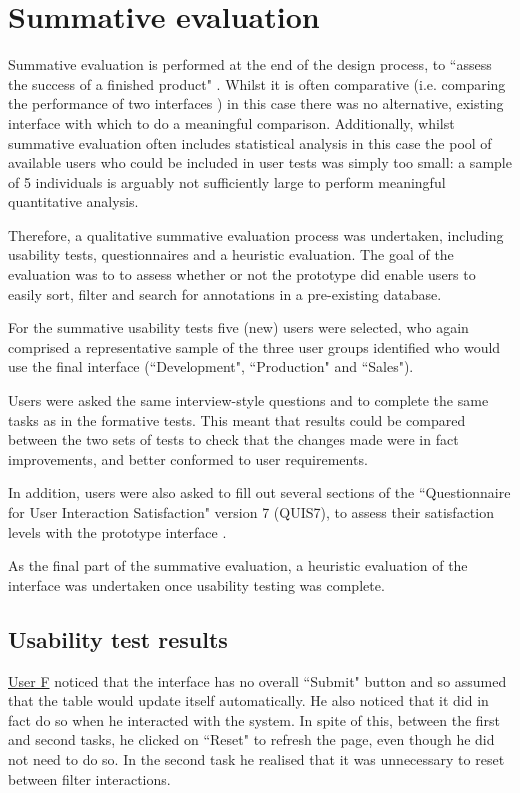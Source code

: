 \section{Summative evaluation}
Summative evaluation is performed at the end of the design process, to ``assess the success of a finished product" \citep[p. 437]{RogersPreece}. Whilst it is often comparative (i.e. comparing the performance of two interfaces \citep[p. 54]{GabbardHix}) in this case there was no alternative, existing interface with which to do a meaningful comparison. Additionally, whilst summative evaluation often includes statistical analysis \cite[p. 149]{Hartson} in this case the pool of available users who could be included in user tests was simply too small: a sample of 5 individuals is arguably not sufficiently large to perform meaningful quantitative analysis. 

Therefore, a qualitative summative evaluation process was undertaken, including usability tests, questionnaires and a heuristic evaluation. The goal of the evaluation was to to assess whether or not the prototype did enable users to easily sort, filter and search for annotations in a pre-existing database.

For the summative usability tests five (new) users were selected, who again comprised a representative sample of the three user groups identified who would use the final interface (``Development", ``Production" and ``Sales").

Users were asked the same interview-style questions and to complete the same tasks as in the formative tests. This meant that results could be compared between the two sets of tests to check that the changes made were in fact improvements, and better conformed to user requirements.

In addition, users were also asked to fill out several sections of the ``Questionnaire for User Interaction Satisfaction" version 7 (QUIS7), to assess their satisfaction levels with the prototype interface \citep{QUIS}. 

As the final part of the summative evaluation, a heuristic evaluation of the interface was undertaken once usability testing was complete. 

\subsection{Usability test results}

\underline{User F} noticed that the interface has no overall ``Submit" button and so assumed that the table would update itself automatically. He also noticed that it did in fact do so when he interacted with the system. In spite of this, between the first and second tasks, he clicked on ``Reset" to refresh the page, even though he did not need to do so. In the second task he realised that it was unnecessary to reset between filter interactions. 

